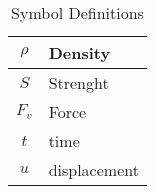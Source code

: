 

\begin{table}[t]
  \centering
  \caption{Symbol Definitions}
  \begin{scriptsize}
    \renewcommand{\arraystretch}{1.1}
    \begin{tabular}{|@{~\ }c|@{~~}p{0.4\hsize}|}
      \hline
      \(\rho\) & Density \\
      \hline
      \(S\) & Strenght \\
      \hline
      \(F_v\) & Force \\
      \hline
      \(t\) & time \\
      \hline
      \(u\) & displacement \\
      \hline
    \end{tabular}
  \end{scriptsize}
  \label{tab:sym}
\end{table}


